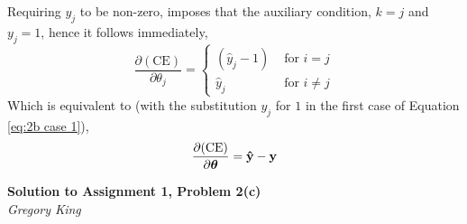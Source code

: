 \documentclass[letter,12pt]{article}
\newcommand{\myhwtitle}[3]
{\begin{center}
{\large {\bf Solution to Assignment {#1}, Problem {#2}}}\\
\medskip 
{\it {#3}} %
\end{center}}
\begin{document}
Requiring $y_{j}$ to be non-zero, imposes that the auxiliary condition, $k=j$ and $y_{j}=1$, hence it follows immediately,
\begin{equation}
\frac{\partial(\textrm{CE})}{\partial{\theta_{j}}} = \begin{cases}
(\hat{y}_{j} - 1)&\text{ for }i=j\label{eq:2b case 1} \\
\hat{y}_{j}&\text{ for }i\neq j
\end{cases}
\end{equation}
Which is equivalent to (with the substitution $y_{j}$ for $1$ in the first case of Equation \ref{eq:2b case 1}),
\begin{equation}
\frac{\partial(\textrm{CE})}{\partial{\boldsymbol\theta}} = \bf{\hat{y}} - \bf{y}
\end{equation}

\clearpage

\myhwtitle{1}{2(c)}{Gregory King}
\bigskip
\end{document}
